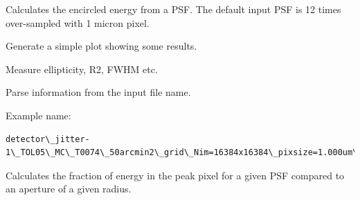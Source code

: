 \documentclass[a4paper,12pt,english]{sphinxmanual}
\begin{document}
\begin{fulllineitems}
\label{analysis:analysis.PSFproperties.encircledEnergy}
Calculates the encircled energy from a PSF.
The default input PSF is 12 times over-sampled with 1 micron pixel.

\end{fulllineitems}


\begin{fulllineitems}
\label{analysis:analysis.PSFproperties.generatePlots}
Generate a simple plot showing some results.

\end{fulllineitems}


\begin{fulllineitems}
\label{analysis:analysis.PSFproperties.measureChars}
Measure ellipticity, R2, FWHM etc.

\end{fulllineitems}


\begin{fulllineitems}
\label{analysis:analysis.PSFproperties.parseName}
Parse information from the input file name.

Example name:

\begin{Verbatim}[commandchars=\\\{\}]
detector\_jitter-1\_TOL05\_MC\_T0074\_50arcmin2\_grid\_Nim=16384x16384\_pixsize=1.000um\_lbda=800nm\_fieldX=-0.306\_fieldY=1.042.fits
\end{Verbatim}

\end{fulllineitems}


\begin{fulllineitems}
\label{analysis:analysis.PSFproperties.peakFraction}
Calculates the fraction of energy in the peak pixel for a given PSF compared
to an aperture of a given radius.

\end{fulllineitems}
\end{document}
